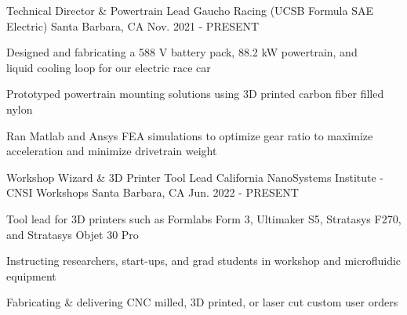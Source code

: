 

\begin{cventries}
\cventry
{Technical Director \& Powertrain Lead} %
{Gaucho Racing (UCSB Formula SAE Electric)} %
{Santa Barbara, CA} %
{Nov. 2021 - PRESENT} %
{ %
\begin{cvitems}   
\item {Designed and fabricating a 588 V battery pack, 88.2 kW powertrain, and \\ liquid cooling loop for our electric race car}
\item {Prototyped powertrain mounting solutions using 3D printed carbon fiber filled nylon}
\item {Ran Matlab and Ansys FEA simulations to optimize gear ratio to maximize acceleration and minimize drivetrain weight}
\end{cvitems}
}


\cventry
{Workshop Wizard \& 3D Printer Tool Lead} %
{California NanoSystems Institute - CNSI Workshops} %
{Santa Barbara, CA} %
{Jun. 2022 - PRESENT} %
{ %
\begin{cvitems}
\item {Tool lead for 3D printers such as Formlabs Form 3, Ultimaker S5, Stratasys F270, and Stratasys Objet 30 Pro}
\item {Instructing researchers, start-ups, and grad students in workshop and microfluidic equipment}
\item {Fabricating \& delivering CNC milled, 3D printed, or laser cut custom user orders }
\end{cvitems}
}





\end{cventries}
